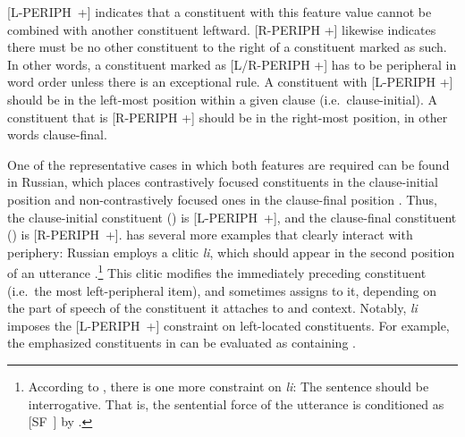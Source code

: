 \mbox{[L-PERIPH +]} indicates that a constituent with this feature
value cannot be combined with another constituent leftward. [R-PERIPH
  +] likewise indicates there must be no other constituent to the
right of a constituent marked as such.  In other words, a constituent
marked as [L/R-PERIPH +] has to be peripheral in word order unless
there is an exceptional rule.  A constituent with [L-PERIPH +]
should be in the left-most position within a given clause
(i.e.\ clause-initial).  A constituent that is
[R-PERIPH +] should be in the right-most position, in other
words clause-final.


One of the representative cases in which both features are required
can be found in Russian, which places contrastively focused
constituents in the clause-initial position and non-contrastively
focused ones in the clause-final position
\citep{neeleman:titov:09}.
Thus, the clause-initial constituent () is
\mbox{[L-PERIPH +]}, and the clause-final constituent
() is \mbox{[R-PERIPH +]}.
 has several more examples that clearly interact with periphery: Russian employs a
clitic \textit{li}, which should appear in the second position of an
utterance \citep{gracheva:13}.\footnote{According to
  \citet{gracheva:13}, there is one more constraint on \textit{li}:
  The sentence should be interrogative. That is, the sentential force
  of the utterance is conditioned as \mbox{[SF ]} by
  .} This clitic modifies the immediately preceding
constituent (i.e.\ the most left-peripheral item), and sometimes
assigns  to it, depending on the part of speech of
the constituent it attaches to and context. Notably,
\textit{li} imposes the \mbox{[L-PERIPH +]} constraint on left-located
constituents. For example, the emphasized constituents in
 can be evaluated as containing
.




